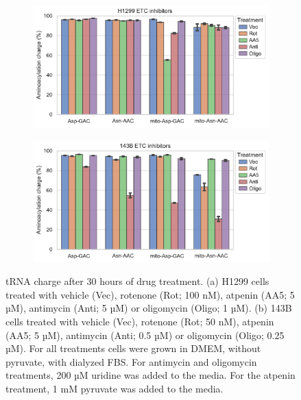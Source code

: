 \begin{figure}[!ht]
     \centering
     \begin{subfigure}[b]{0.6\textwidth}
         \includegraphics[width=\textwidth]{figures/chap2/H1299_ETCinhib_Asp-Asn.pdf}
     \end{subfigure}
     \begin{subfigure}[b]{0.6\textwidth}
         \vspace{5pt}
         \includegraphics[width=\textwidth]{figures/chap2/143B_ETCinhib_Asp-Asn.pdf}
     \end{subfigure}
     \hfill
        \caption[ETC inhibitor in H1299/143B, effect on tRNA charge.]{
        tRNA charge after 30 hours of drug treatment.
        (a) H1299 cells treated with vehicle (Vec), rotenone (Rot; 100 nM), atpenin (AA5; 5 µM), antimycin (Anti; 5 µM) or oligomycin (Oligo; 1 µM).
        (b) 143B cells treated with vehicle (Vec), rotenone (Rot; 50 nM), atpenin (AA5; 5 µM), antimycin (Anti; 0.5 µM) or oligomycin (Oligo; 0.25 µM).
        For all treatments cells were grown in DMEM, without pyruvate, with dialyzed FBS.
        For antimycin and oligomycin treatments, 200 µM uridine was added to the media.
        For the atpenin treatment, 1 mM pyruvate was added to the media.
        }
        \label{fig:ch2:tRNA:H1299_143B_ETCinhib}
\end{figure}




